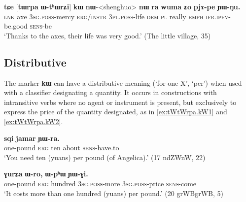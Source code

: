 \documentclass[oldfontcommands,oneside,a4paper,11pt]{article}
\newcommand{\ipa}[1]{{\phon\textbf{#1}}}
\begin{document}
  \begin{exe}
\ex \label{ex:WthWrZi.kW}
\gll
\ipa{tɕe}  	[\ipa{tɯrpa}  	\ipa{ɯ-tʰɯrʑi}]  	\ipa{kɯ}  	\ipa{nɯ}-<shenghuo>  	\ipa{nɯ} \ipa{ra}  	\ipa{wuma}  	\ipa{ʑo}  	\ipa{pjɤ-pe}  	\ipa{ɲɯ-ŋu.}  \\
\textsc{lnk} axe \textsc{3sg.poss}-mercy \textsc{erg/instr} \textsc{3pl.poss}-life \textsc{dem} \textsc{pl} really \textsc{emph} \textsc{ifr.ipfv}-be.good \textsc{sens}-be \\
\glt `Thanks to the axes, their life was very good.' (The little village, 35)
  \end{exe}
  
  

 
 
\subsection{Distributive} \label{sec:distributive}
The marker \ipa{kɯ} can have   a distributive meaning (`for one X', `per') when used with a classifier designating a quantity. It occurs  in constructions with intransitive verbs where no agent or instrument is present, but exclusively to express the price of the quantity designated, as in  \ref{ex:tWtWrpa.kW1} and \ref{ex:tWtWrpa.kW2}.

 \begin{exe} 
\ex \label{ex:tWtWrpa.kW1}
\gll  
[\ipa{tɯ-tɯrpa}] 	\ipa{\textbf{kɯ}} 	\ipa{sqi} 	\ipa{jamar} 	\ipa{ɲɯ-ra.} 	\\
one-pound \textsc{erg} ten about \textsc{sens}-have.to \\
\glt `You need ten (yuans) per pound (of Angelica).' (17 ndZWnW, 22)
\end{exe}  

 \begin{exe} 
\ex \label{ex:tWtWrpa.kW2}
\gll  
[\ipa{tɯ-tɯrpa}]  	\ipa{\textbf{kɯ}}  	\ipa{ɣurʑa}  	\ipa{ɯ-ro,}  	\ipa{ɯ-pʰɯ}  	\ipa{ɲɯ-ɣi.}  \\
one-pound \textsc{erg} hundred \textsc{3sg.poss}-more \textsc{3sg.poss}-price \textsc{sens}-come \\
\glt `It costs more than one hundred (yuans) per pound.' (20 grWBgrWB, 5)
\end{exe}  
\end{document}
